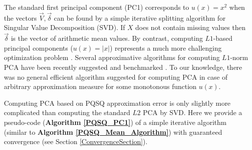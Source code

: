 \documentclass[preprint,12pt,twocolumn]{elsarticle}
\begin{document}
The standard first principal component (PC1) corresponds to $u(x)=x^2$ when the vectors $\vec{V}, \vec{\delta}$ can be found by a simple iterative splitting algorithm for Singular Value Decomposition (SVD). If $X$ does not contain missing values then $\vec{\delta}$ is the vector of arithmetic mean values. By contrast, computing $L1$-based principal components ($u(x)=|x|$) represents a much more challenging optimization problem \cite{Brooks2013}. Several approximative algorithms for computing $L1$-norm PCA have been recently suggested and benchmarked \cite{Ke2005,Kwak2008,Brooks2013,brooks2012pcal1,Park2014}. To our knowledge, there was no general efficient algorithm suggested for computing PCA in case of arbitrary approximation measure for some monotonous function $u(x)$.

Computing PCA based on PQSQ approximation error is only slightly more complicated than computing the standard $L2$ PCA by SVD. Here we provide a pseudo-code (\textbf{Algorithm \ref{PQSQ_PC1}}) of a simple iterative algorithm (similar to \textbf{Algorithm \ref{PQSQ_Mean_Algorithm}}) with guaranteed convergence (see Section \ref{ConvergenceSection}).
\end{document}
